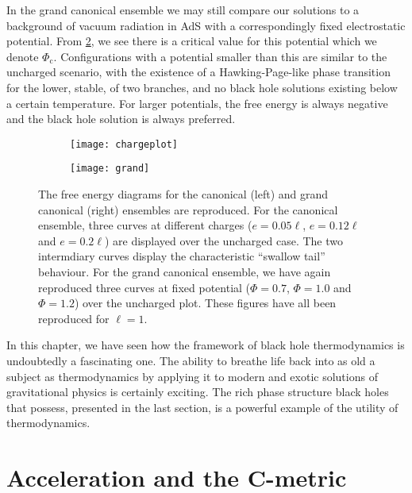 \documentclass[
twoside,
openright,
frontopenright,
]{dmathesis}
\begin{document}
In the grand canonical ensemble we may still compare our solutions to a
background of vacuum radiation in AdS with a correspondingly fixed electrostatic
potential. From \cref{fig:grand}, we see there is a critical value for this
potential which we denote $\Phi_\mathrm{c}$. Configurations with a potential
smaller than this are similar to the uncharged scenario, with the existence of a
Hawking-Page-like phase transition for the lower, stable, of two branches, and
no black hole solutions existing below a certain temperature. For larger
potentials, the free energy is always negative and the black hole solution is
always preferred.

\begin{figure}
  \centering
  \begin{subfigure}[b]{0.45\textwidth}
    \texttt{[image: chargeplot]}
    \caption{\label{fig:charge-fe}}
  \end{subfigure}\qquad
  \begin{subfigure}[b]{0.45\textwidth}
    \texttt{[image: grand]}
    \caption{\label{fig:grand}}
  \end{subfigure}
  \caption{\label{fig:chargeplots}The free energy diagrams for the canonical
    (left) and grand canonical (right) ensembles are reproduced. For the
    canonical ensemble, three curves at different charges ($e = 0.05\ell$,
    $e=0.12\ell$ and $e = 0.2\ell$) are displayed over the uncharged case. The
    two intermdiary curves display the characteristic ``swallow tail''
    behaviour. For the grand canonical ensemble, we have again reproduced three
    curves at fixed potential ($\Phi = 0.7$, $\Phi = 1.0$ and $\Phi = 1.2$) over the
    uncharged plot. These figures have all been reproduced for $\ell = 1$.}
\end{figure}

In this chapter, we have seen how the framework of black hole thermodynamics is
undoubtedly a fascinating one. The ability to breathe life back into as old a
subject as thermodynamics by applying it to modern and exotic solutions of
gravitational physics is certainly exciting. The rich phase structure black
holes that possess, presented in the last section, is a powerful example of the
utility of thermodynamics.
 
\chapter{Acceleration and the C-metric}
\label{cha:cmet}
\end{document}
